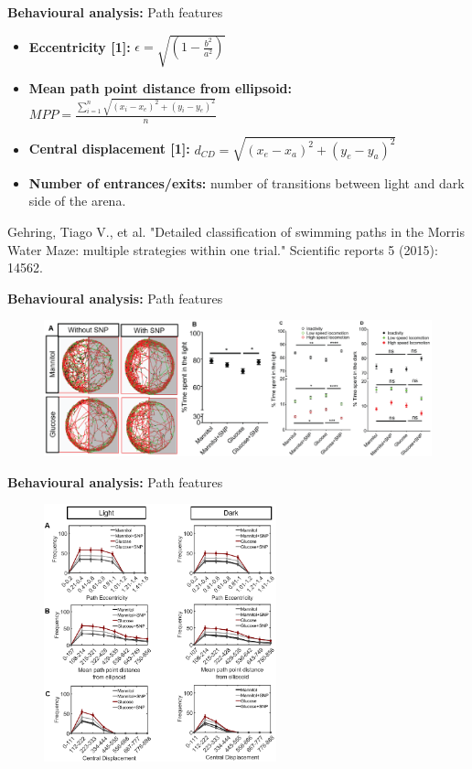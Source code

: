 \documentclass{beamer}
\newlength{\tmpShadow}
\newcommand{\MyShadow}[2]{%
	\settowidth{\tmpShadow}{#1}
	\addtolength{\tmpShadow}{.1em}
	\raisebox{-0.25ex}{\textcolor{gray!70}{#1}}%
	\kern-\tmpShadow%
	\textcolor{#2}{#1}%
}
\begin{document}
{\begin{frame}{\textbf{Behavioural analysis:} Path features}
	\begin{itemize}[label={\MyShadow{$\bullet$}{blue!80}}]
		\setlength\itemsep{2em}
		\item \textbf{Eccentricity [1]:} $\epsilon = \sqrt{(1-\frac{b^2}{a^2})}$
		\item \textbf{Mean path point distance from ellipsoid:} $MPP = \frac{\sum_{i=1}^{n}\sqrt{(x_i-x_e)^2 + (y_i-y_e)^2}}{n}$
		\item \textbf{Central displacement [1]:} $d_{CD} = \sqrt{(x_e-x_a)^2 + (y_e-y_a)^2}$ 
		\item \textbf{Number of entrances/exits:} number of transitions between light and dark side of the arena.
	\end{itemize}	
	\vspace{10mm}
	\tiny{Gehring, Tiago V., et al. "Detailed classification of swimming paths in the Morris Water Maze: multiple strategies within one trial." Scientific reports 5 (2015): 14562.}
\end{frame}

\begin{frame}{\textbf{Behavioural analysis:} Path features}
	\begin{figure}[H]
		\centering
		\includegraphics[width=\textwidth]{figures/results1}
	\end{figure}	
\end{frame}

\begin{frame}{\textbf{Behavioural analysis:} Path features}
	\begin{figure}[H]
		\centering
		\includegraphics[width=0.6\textwidth]{figures/results2}
	\end{figure}	
\end{frame}

}
\end{document}
